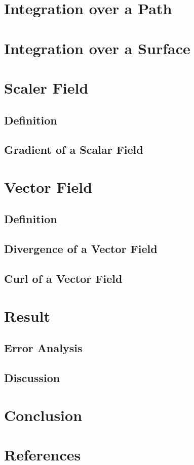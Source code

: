 \documentclass[12pt]{article}
\begin{document}
\newpage
\section{Integration over a Path}



\newpage
\section{Integration over a Surface}



\newpage
\section{Scaler Field}
\subsection{Definition}



\subsection{Gradient of a Scalar Field}



\newpage
\section{Vector Field}
\subsection{Definition}



\subsection{Divergence of a Vector Field}



\subsection{Curl of a Vector Field}



\newpage
\section{Result}
\subsection{Error Analysis}



\subsection{Discussion}



\newpage
\section{Conclusion}



\newpage
\section{References}


\nocite{El-Deeb_PEU-218_Assignments}
\end{document}
